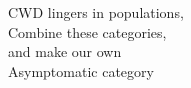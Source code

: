 \documentclass[preview]{standalone}
\begin{document}
\begin{center}
CWD lingers in populations,\\Combine these categories,\\and make our own\\Asymptomatic category
\end{center}
\end{document}
